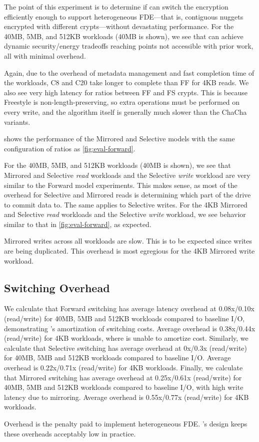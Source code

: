 The point of this experiment is to determine if \sys can switch the encryption
efficiently enough to support heterogeneous FDE---that is, contiguous nuggets
encrypted with different crypts---without devastating performance. For the 40MB,
5MB, and 512KB workloads (40MB is shown), we see that \sys can achieve dynamic
security/energy tradeoffs reaching points not accessible with prior work, all
with minimal overhead.

Again, due to the overhead of metadata management and fast completion time of
the workloads, C8 and C20 take longer to complete than FF for 4KB reads. We also
see very high latency for ratios between FF and FS crypts. This is because
Freestyle is non-length-preserving, so extra operations must be performed on
every write, and the algorithm itself is generally much slower than the ChaCha
variants.



 shows the performance of the Mirrored and Selective models
with the same configuration of ratios as \cref{fig:eval-forward}.

For the 40MB, 5MB, and 512KB workloads (40MB is shown), we see that Mirrored and
Selective {\em read} workloads and the Selective {\em write} workload are very
similar to the Forward model experiments. This makes sense, as most of the
overhead for Selective and Mirrored reads is determining which part of the drive
to commit data to. The same applies to Selective writes. For the 4KB Mirrored
and Selective {\em read} workloads and the Selective {\em write} workload, we
see behavior similar to that in \cref{fig:eval-forward}, as expected.

Mirrored writes across all workloads are slow. This is to be expected since
writes are being duplicated. This overhead is most egregious for the 4KB
Mirrored write workload.


\subsection{Switching Overhead}\label{subsec:eval-overhead}

We calculate that Forward switching has average latency overhead at 0.08x/0.10x
(read/write) for 40MB, 5MB and 512KB workloads compared to baseline I/O,
demonstrating \sys's amortization of switching costs. Average overhead is
0.38x/0.44x (read/write) for 4KB workloads, where \sys is unable to amortize
cost. Similarly, we calculate that Selective switching has average overhead at
0x/0.3x (read/write) for 40MB, 5MB and 512KB workloads compared to baseline I/O.
Average overhead is 0.22x/0.71x (read/write) for 4KB workloads. Finally, we
calculate that Mirrored switching has average overhead at 0.25x/0.61x
(read/write) for 40MB, 5MB and 512KB workloads compared to baseline I/O, with
high write latency due to mirroring. Average overhead is 0.55x/0.77x
(read/write) for 4KB workloads.

Overhead is the penalty paid to implement heterogeneous FDE. \sys's design keeps
these overheads acceptably low in practice.
